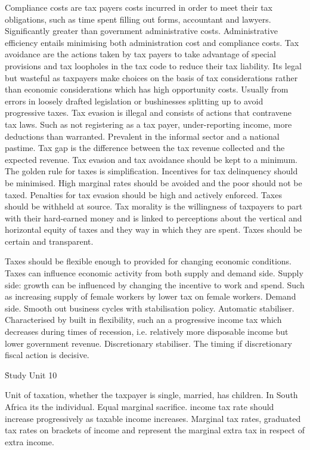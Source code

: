 \documentclass[12pt]{examnotes}
\begin{document}
\ra Compliance costs are tax payers costs incurred in order to meet their tax obligations, such as time spent filling out forms, accountant and lawyers. Significantly greater than government administrative costs.
\ra Administrative efficiency entails minimising both administration cost and compliance costs.
\ra Tax avoidance are the actions taken by tax payers to take advantage of special provisions and tax loopholes in the tax code to reduce their tax liability. Its legal but wasteful as taxpayers make choices on the basis of tax considerations rather than economic considerations which has high opportunity costs. Usually from errors in loosely drafted legislation or bushinesses splitting up to avoid progressive taxes.
\ra Tax evasion is illegal and consists of actions that contravene tax laws. Such as not registering as a tax payer, under-reporting income, more deductions than warranted. Prevalent in the informal sector and a national pastime.
\ra Tax gap is the difference between the tax revenue collected and the expected revenue.
\ra Tax evasion and tax avoidance should be kept to a minimum. 
\ra The golden rule for taxes is simplification. Incentives for tax delinquency should be minimised. High marginal rates should be avoided and the poor should not be taxed. Penalties for tax evasion should be high and actively enforced. 
\ra Taxes should be withheld at source.
\ra Tax morality is the willingness of taxpayers to part with their hard-earned money and is linked to perceptions about the vertical and horizontal equity of taxes and they way in which they are spent.
\ra Taxes should be certain and transparent.

\ra Taxes should be flexible enough to provided for changing economic conditions. Taxes can influence economic activity from both supply and demand side. 
\ra Supply side: growth can be influenced by changing the incentive to work and spend. Such as increasing supply of female workers by lower tax on female workers.
\ra Demand side. Smooth out business cycles with stabilisation policy.
 Automatic stabiliser. Characterised by built in flexibility, such an a progressive income tax which decreases during times of recession, i.e. relatively more disposable income but lower government revenue. 
 Discretionary stabiliser. The timing if discretionary fiscal action is decisive.

\h{Study Unit 10}

\ra Unit of taxation, whether the taxpayer is single, married, has children. In South Africa its the individual.
\ra Equal marginal sacrifice. income tax rate should increase progressively as taxable income increases.
\ra Marginal tax rates, graduated tax rates on brackets of income and represent the marginal extra tax in respect of extra income.
\end{document}
